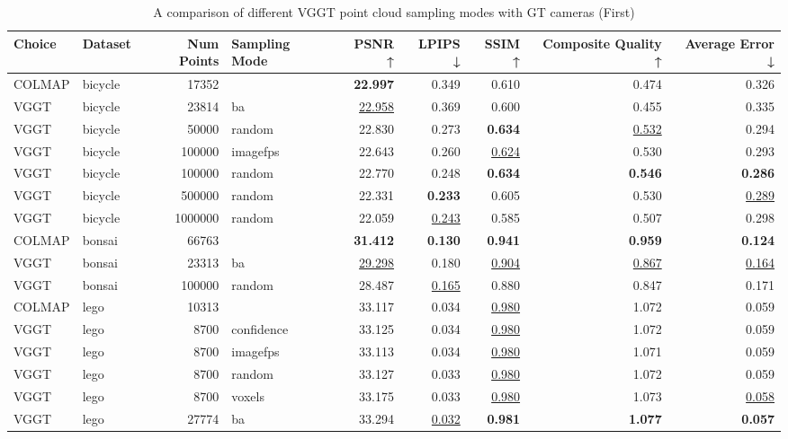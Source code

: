 \begin{table}[H]
\caption{\ifdefined\customcaption \customcaption \else A comparison of different VGGT point cloud sampling modes with GT cameras (First) \fi}
\label{tab:03_sampling_mode_gt_cams_first}
\centering
\scriptsize
\begin{tabular}{llrlrrrrr}
\toprule
Choice & Dataset & Num Points & Sampling Mode & PSNR ↑ & LPIPS ↓ & SSIM ↑ & Composite Quality ↑ & Average Error ↓ \\
\midrule
COLMAP & bicycle & 17352 &  & \textbf{22.997} & 0.349 & 0.610 & 0.474 & 0.326 \\
VGGT & bicycle & 23814 & ba & \underline{22.958} & 0.369 & 0.600 & 0.455 & 0.335 \\
VGGT & bicycle & 50000 & random & 22.830 & 0.273 & \textbf{0.634} & \underline{0.532} & 0.294 \\
VGGT & bicycle & 100000 & imagefps & 22.643 & 0.260 & \underline{0.624} & 0.530 & 0.293 \\
VGGT & bicycle & 100000 & random & 22.770 & 0.248 & \textbf{0.634} & \textbf{0.546} & \textbf{0.286} \\
VGGT & bicycle & 500000 & random & 22.331 & \textbf{0.233} & 0.605 & 0.530 & \underline{0.289} \\
VGGT & bicycle & 1000000 & random & 22.059 & \underline{0.243} & 0.585 & 0.507 & 0.298 \\
\midrule
COLMAP & bonsai & 66763 &  & \textbf{31.412} & \textbf{0.130} & \textbf{0.941} & \textbf{0.959} & \textbf{0.124} \\
VGGT & bonsai & 23313 & ba & \underline{29.298} & 0.180 & \underline{0.904} & \underline{0.867} & \underline{0.164} \\
VGGT & bonsai & 100000 & random & 28.487 & \underline{0.165} & 0.880 & 0.847 & 0.171 \\
\midrule
COLMAP & lego & 10313 &  & 33.117 & 0.034 & \underline{0.980} & 1.072 & 0.059 \\
VGGT & lego & 8700 & confidence & 33.125 & 0.034 & \underline{0.980} & 1.072 & 0.059 \\
VGGT & lego & 8700 & imagefps & 33.113 & 0.034 & \underline{0.980} & 1.071 & 0.059 \\
VGGT & lego & 8700 & random & 33.127 & 0.033 & \underline{0.980} & 1.072 & 0.059 \\
VGGT & lego & 8700 & voxels & 33.175 & 0.033 & \underline{0.980} & 1.073 & \underline{0.058} \\
VGGT & lego & 27774 & ba & 33.294 & \underline{0.032} & \textbf{0.981} & \textbf{1.077} & \textbf{0.057} \\

\end{tabular}
\end{table}
